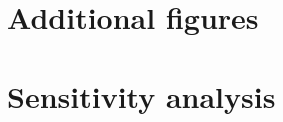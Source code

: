 \appendix
\chapter{Additional figures} \label{App:A}
\lipsum[1]


\chapter{Sensitivity analysis}\label{App:B}
\lipsum[2]